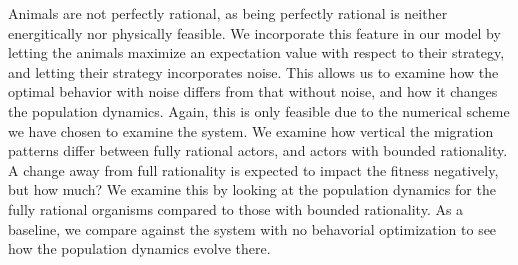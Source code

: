 Animals are not perfectly rational, as being perfectly rational is neither energitically nor physically feasible. We incorporate this feature in our model by letting the animals maximize an expectation value with respect to their strategy, and letting their strategy incorporates noise. This allows us to examine how the optimal behavior with noise differs from that without noise, and how it changes the population dynamics. Again, this is only feasible due to the numerical scheme we have chosen to examine the system. We examine how vertical the migration patterns differ between fully rational actors, and actors with bounded rationality. A change away from full rationality is expected to impact the fitness negatively, but how much? We examine this by looking at the population dynamics for the fully rational organisms compared to those with bounded rationality. As a baseline, we compare against the system with no behavorial optimization to see how the population dynamics evolve there.









